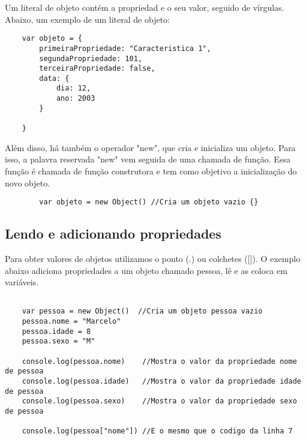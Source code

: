 	Um literal de objeto contém a propriedad e o seu valor, seguido de vírgulas. Abaixo, um exemplo de um literal de objeto: \newline 
   \begin{lstlisting}
    var objeto = {
    	primeiraPropriedade: "Caracteristica 1",
    	segundaPropriedade: 101,
    	terceiraPropriedade: false,
    	data: {
    		dia: 12,
    		ano: 2003
    	}
    
    }
    \end{lstlisting}

	Além disso, há também o operador "new", que cria e inicializa um objeto. Para isso, a palavra reservada "new" vem seguida de uma chamada de função. Essa função é chamada de função construtora e tem como objetivo a inicialização do novo objeto.
	
	\begin{lstlisting}
		var objeto = new Object() //Cria um objeto vazio {}
	\end{lstlisting}
	
	\subsection{Lendo e adicionando propriedades}
	Para obter valores de objetos utilizamos o ponto (.) ou colchetes ([]). O exemplo abaixo adiciona propriedades a um objeto chamado pessoa, lê e as coloca em variáveis.
	\newline
	\newline
	\begin{lstlisting}
	
	var pessoa = new Object()  //Cria um objeto pessoa vazio
	pessoa.nome = "Marcelo"
	pessoa.idade = 8
	pessoa.sexo = "M"
	
	console.log(pessoa.nome)	//Mostra o valor da propriedade nome de pessoa
	console.log(pessoa.idade)	//Mostra o valor da propriedade idade de pessoa
	console.log(pessoa.sexo) 	//Mostra o valor da propriedade sexo de pessoa

	console.log(pessoa["nome"]) //E o mesmo que o codigo da linha 7
	\end{lstlisting}
